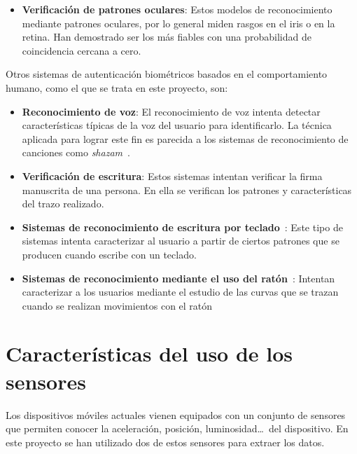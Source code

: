 \begin{enumerate}
\begin{itemize}
        \item \textbf{Verificación de patrones oculares}: Estos modelos de reconocimiento mediante patrones oculares, por lo general miden rasgos en el iris o en la retina. Han demostrado ser los más fiables con una probabilidad de coincidencia cercana a cero. 
        
    \end{itemize}
    
    Otros sistemas de autenticación biométricos basados en el comportamiento humano, como el que se trata en este proyecto, son:
    
    \begin{itemize}
        \item \textbf{Reconocimiento de voz}: El reconocimiento de voz intenta detectar características típicas de la voz del usuario para identificarlo. La técnica aplicada para lograr este fin es parecida a los sistemas de reconocimiento de canciones como \textit{shazam}~\cite{shazam}.
        
        
        \item \textbf{Verificación de escritura}: Estos sistemas intentan verificar la firma manuscrita de una persona. En ella se verifican los patrones y características del trazo realizado.
        
        \item \textbf{Sistemas de reconocimiento de escritura por teclado}~\cite{daniel_garabato}: Este tipo de sistemas intenta caracterizar al usuario a partir de ciertos patrones que se producen cuando escribe con un teclado.
        
        \item \textbf{Sistemas de reconocimiento mediante el uso del ratón}~\cite{jorge_rodriguez}: Intentan caracterizar a los usuarios mediante el estudio de las curvas que se trazan cuando se realizan movimientos con el ratón
        
    \end{itemize}
    
    
    
\end{enumerate}



\section{Características del uso de los sensores}

Los dispositivos móviles actuales vienen equipados con un conjunto de sensores~\cite{sensor_draft} que permiten conocer la aceleración, posición, luminosidad\dots~del dispositivo. En este proyecto se han utilizado dos de estos sensores para extraer los datos.

